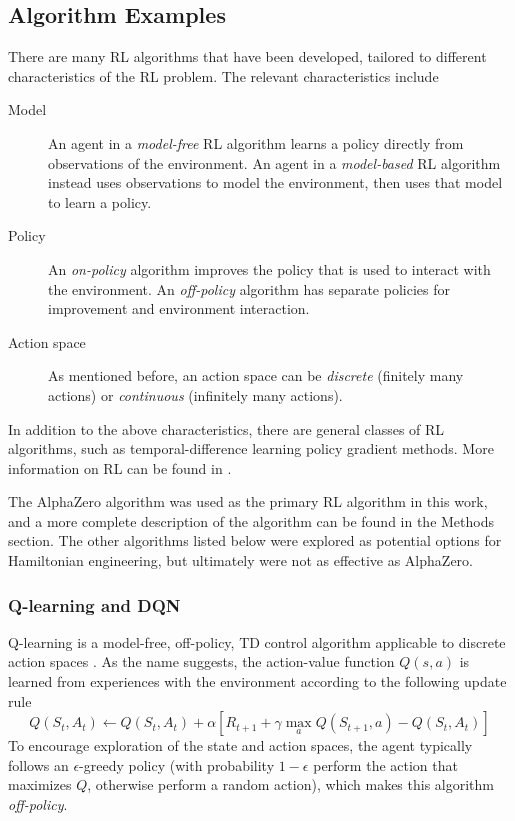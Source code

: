 \subsection{Algorithm Examples}

There are many RL algorithms that have been developed, tailored to different characteristics of the RL problem. The relevant characteristics include
\begin{description}
    \item[Model] An agent in a \emph{model-free} RL algorithm learns a policy directly from observations of the environment. An agent in a \emph{model-based} RL algorithm instead uses observations to model the environment, then uses that model to learn a policy.
    \item[Policy] An \emph{on-policy} algorithm improves the policy that is used to interact with the environment. An \emph{off-policy} algorithm has separate policies for improvement and environment interaction.
    \item[Action space] As mentioned before, an action space can be \emph{discrete} (finitely many actions) or \emph{continuous} (infinitely many actions).
\end{description}
In addition to the above characteristics, there are general classes of RL algorithms, such as temporal-difference learning policy gradient methods. More information on RL can be found in \cite{sutton2018reinforcement}.

The AlphaZero algorithm was used as the primary RL algorithm in this work, and a more complete description of the algorithm can be found in the Methods section. The other algorithms listed below were explored as potential options for Hamiltonian engineering, but ultimately were not as effective as AlphaZero.

\subsubsection{Q-learning and DQN}

Q-learning is a model-free, off-policy, TD control algorithm applicable to discrete action spaces \cite{watkins1989learning}. As the name suggests, the action-value function $Q(s,a)$ is learned from experiences with the environment according to the following update rule
\begin{equation}\label{eq:Q_learning_update}
    Q(S_t, A_t) \leftarrow Q(S_t, A_t) +
        \alpha \left[ R_{t+1} + \gamma \max_a Q(S_{t+1}, a) - Q(S_t, A_t) \right]
\end{equation}
To encourage exploration of the state and action spaces, the agent typically follows an $\epsilon$-greedy policy (with probability $1-\epsilon$ perform the action that maximizes $Q$, otherwise perform a random action), which makes this algorithm \emph{off-policy}.

